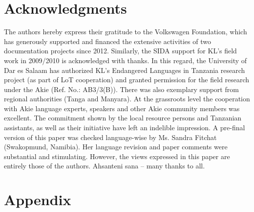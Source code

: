 \documentclass[output=paper,colorlinks,citecolor=brown]{langscibook}
\begin{document}
\section*{Acknowledgments}
The authors hereby express their gratitude to the Volkswagen Foundation, which has generously supported and financed the extensive activities of two documentation projects since 2012. Similarly, the SIDA support for KL's field work in 2009/2010 is acknowledged with thanks. In this regard, the University of Dar es Salaam has authorized KL's Endangered Languages in Tanzania research project (as part of LoT cooperation) and granted permission for the field research under the Akie (Ref. No.: AB3/3(B)). There was also exemplary support from regional authorities (Tanga and Manyara). At the grassroots level the cooperation with Akie language experts, speakers and other Akie community members was excellent. The commitment shown by the local resource persons and Tanzanian assistants, as well as their initiative have left an indelible impression. A pre-final version of this paper was checked language-wise by Ms. Sandra Fitchat (Swakopmund, Namibia). Her language revision and paper comments were substantial and stimulating. However, the views expressed in this paper are entirely those of the authors. 
Ahsanteni sana -- many thanks to all.

\section*{Appendix}
\end{document}
